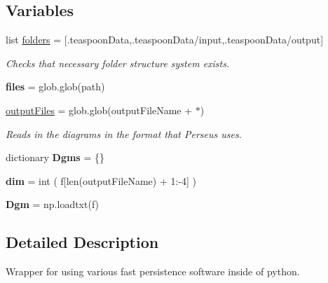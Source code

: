 \subsection*{Variables}
\begin{DoxyCompactItemize}
\item 
list \hyperlink{namespaceteaspoon_1_1_t_d_a_1_1_persistence_a5d89c08933153d3fea60fd71e9e16800}{folders} = \mbox{[}\textquotesingle{}.teaspoon\+Data\textquotesingle{},\textquotesingle{}.teaspoon\+Data/input\textquotesingle{},\textquotesingle{}.teaspoon\+Data/output\textquotesingle{}\mbox{]}
\begin{DoxyCompactList}\small\item\em Checks that necessary folder structure system exists. \end{DoxyCompactList}\item 
\mbox{\label{namespaceteaspoon_1_1_t_d_a_1_1_persistence_ad1e9deccaa1b4485ba18e22b81101f09}} 
{\bfseries files} = glob.\+glob(path)
\item 
\hyperlink{namespaceteaspoon_1_1_t_d_a_1_1_persistence_ae41c85513e98b32d96c75124929c4d2c}{output\+Files} = glob.\+glob(output\+File\+Name + \textquotesingle{}$\ast$\textquotesingle{})
\begin{DoxyCompactList}\small\item\em Reads in the diagrams in the format that Perseus uses. \end{DoxyCompactList}\item 
\mbox{\label{namespaceteaspoon_1_1_t_d_a_1_1_persistence_a23124e4420ddc7cc2be201af0d46f384}} 
dictionary {\bfseries Dgms} = \{\}
\item 
\mbox{\label{namespaceteaspoon_1_1_t_d_a_1_1_persistence_a401a006d9a9151a63298278d463f7973}} 
{\bfseries dim} = int ( f\mbox{[}len(output\+File\+Name) + 1\+:-\/4\mbox{]} )
\item 
\mbox{\label{namespaceteaspoon_1_1_t_d_a_1_1_persistence_ad755079d8b56f84312c5e4f23db15f19}} 
{\bfseries Dgm} = np.\+loadtxt(f)
\end{DoxyCompactItemize}


\subsection{Detailed Description}
Wrapper for using various fast persistence software inside of python. 

